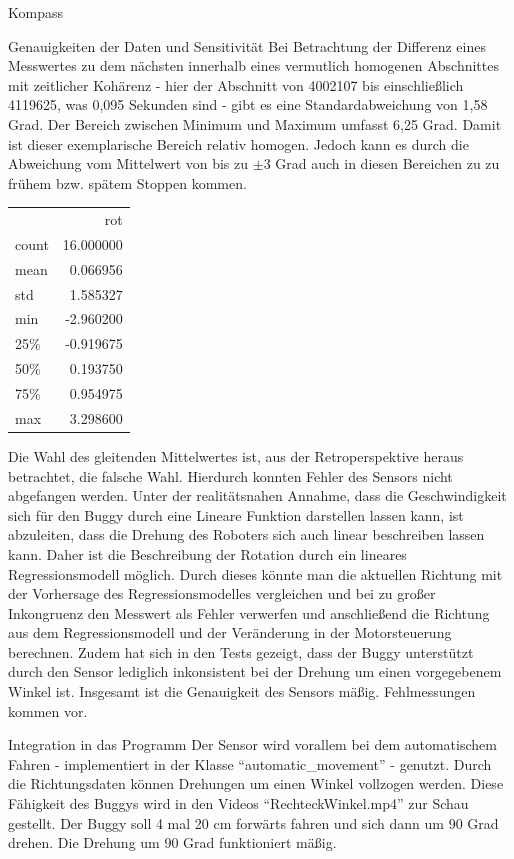 \documentclass[12pt]{report}
\begin{document}
\begin{section}{Kompass}
\begin{subsection}{Genauigkeiten der Daten und Sensitivität}
  Bei Betrachtung der Differenz eines Messwertes zu dem nächsten innerhalb eines
  vermutlich homogenen Abschnittes mit zeitlicher Kohärenz - hier der
  Abschnitt von 4002107 bis einschließlich 4119625, was 0,095 Sekunden sind -
  gibt es eine Standardabweichung von 1,58 Grad. Der Bereich zwischen Minimum
  und Maximum umfasst 6,25 Grad. Damit ist dieser exemplarische Bereich relativ
  homogen. Jedoch kann es durch die Abweichung vom Mittelwert von bis zu $\pm 3$
  Grad auch in diesen Bereichen zu zu frühem bzw. spätem Stoppen kommen.
  \begin{tabular}{lr}
    {} &        rot \\
    count &  16.000000 \\
    mean  &   0.066956 \\
    std   &   1.585327 \\
    min   &  -2.960200 \\
    25\%   &  -0.919675 \\
    50\%   &   0.193750 \\
    75\%   &   0.954975 \\
    max   &   3.298600 \\
  \end{tabular}

  Die Wahl des gleitenden Mittelwertes ist, aus der Retroperspektive heraus
  betrachtet, die falsche Wahl. Hierdurch konnten Fehler des Sensors nicht abgefangen
  werden. Unter der realitätsnahen Annahme, dass die Geschwindigkeit
  sich für den Buggy durch eine Lineare Funktion darstellen lassen kann, ist
  abzuleiten, dass die Drehung des Roboters sich auch linear beschreiben lassen kann.
  Daher ist die Beschreibung der Rotation durch ein lineares Regressionsmodell möglich.
  Durch dieses könnte man die aktuellen Richtung mit der Vorhersage des
  Regressionsmodelles vergleichen und bei zu großer Inkongruenz den Messwert als
  Fehler verwerfen und anschließend die Richtung aus dem Regressionsmodell und der
  Veränderung in der Motorsteuerung berechnen.
  Zudem hat sich in den Tests gezeigt, dass der Buggy unterstützt durch den
  Sensor lediglich inkonsistent bei der Drehung um einen vorgegebenem Winkel ist.
  Insgesamt ist die Genauigkeit des Sensors mäßig. Fehlmessungen kommen vor.

  \end{subsection}
  \begin{subsection}{Integration in das Programm}
    Der Sensor wird vorallem bei dem automatischem Fahren - implementiert in der
    Klasse ``automatic\_movement'' - genutzt. Durch die
    Richtungsdaten können Drehungen um einen Winkel vollzogen werden. Diese
    Fähigkeit des Buggys wird in den Videos ``RechteckWinkel.mp4'' zur Schau
    gestellt. Der Buggy soll 4 mal 20 cm forwärts fahren und sich dann um 90
    Grad drehen. Die Drehung um 90 Grad funktioniert mäßig.


\end{subsection}
\end{section}
\end{document}
